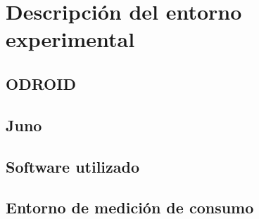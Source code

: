 \section{Descripción del entorno experimental}

\subsection{ODROID}

\subsection{Juno}

\subsection{Software utilizado}

\subsection{Entorno de medición de consumo}


